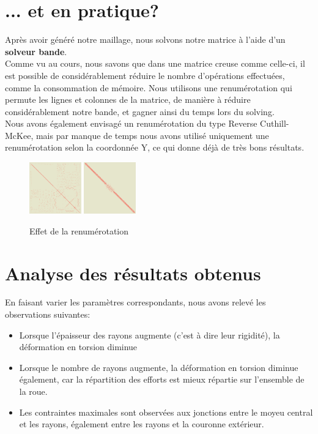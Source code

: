 \documentclass[conference]{IEEEtran}
\begin{document}
\section*{... et en pratique?}
Après avoir généré notre maillage, nous solvons notre matrice à l'aide d'un \textbf{solveur bande}. \\
Comme vu au cours, nous savons que dans une matrice creuse comme celle-ci, il est possible de considérablement réduire le nombre d'opérations effectuées, comme la consommation de mémoire. Nous utilisons une renumérotation qui permute les lignes et colonnes de la matrice, de manière à réduire considérablement notre bande, et gagner ainsi du temps lors du solving. \\
Nous avons également envisagé un renumérotation du type Reverse Cuthill-McKee, mais par manque de temps nous avons utilisé uniquement une renumérotation selon la coordonnée Y, ce qui donne déjà de très bons résultats.
\begin{figure}[h]
    \centering
    \includegraphics[width=0.2\textwidth]{../Figures/sans_renum.png}
    \includegraphics[width=0.2\textwidth]{../Figures/avec_renum.png}
    \caption{Effet de la renumérotation}
\end{figure}

\section*{Analyse des résultats obtenus}

En faisant varier les paramètres correspondants, nous avons relevé les observations suivantes: 
\begin{itemize}
    \item Lorsque l'épaisseur des rayons augmente (c'est à dire leur rigidité), la déformation en torsion diminue
    \item Lorsque le nombre de rayons augmente, la déformation en torsion diminue également, car la répartition des efforts est mieux répartie sur l'ensemble de la roue.
    \item Les contraintes maximales sont observées aux jonctions entre le moyeu central et les rayons, également entre les rayons et la couronne extérieur. 
\end{itemize}
\end{document}
